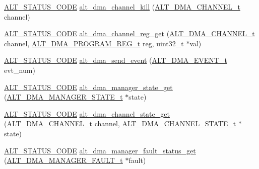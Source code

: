 \begin{DoxyCompactItemize}
\item 
\mbox{\hyperlink{hwlib_8h_abdb0d369f069723ca55d6c94bcaaaa12}{A\+L\+T\+\_\+\+S\+T\+A\+T\+U\+S\+\_\+\+C\+O\+DE}} \mbox{\hyperlink{group__ALT__DMA__CSR_gae013242eb7708db8292c6388def7802a}{alt\+\_\+dma\+\_\+channel\+\_\+kill}} (\mbox{\hyperlink{group__ALT__DMA__COMMON_ga959232e3b00ce45a3049183cce4c9d59}{A\+L\+T\+\_\+\+D\+M\+A\+\_\+\+C\+H\+A\+N\+N\+E\+L\+\_\+t}} channel)
\item 
\mbox{\hyperlink{hwlib_8h_abdb0d369f069723ca55d6c94bcaaaa12}{A\+L\+T\+\_\+\+S\+T\+A\+T\+U\+S\+\_\+\+C\+O\+DE}} \mbox{\hyperlink{group__ALT__DMA__CSR_ga25d4eb2ae938f83381401260348c3cb5}{alt\+\_\+dma\+\_\+channel\+\_\+reg\+\_\+get}} (\mbox{\hyperlink{group__ALT__DMA__COMMON_ga959232e3b00ce45a3049183cce4c9d59}{A\+L\+T\+\_\+\+D\+M\+A\+\_\+\+C\+H\+A\+N\+N\+E\+L\+\_\+t}} channel, \mbox{\hyperlink{group__ALT__DMA__PRG_ga772371a3d6334e110911154cf94950e8}{A\+L\+T\+\_\+\+D\+M\+A\+\_\+\+P\+R\+O\+G\+R\+A\+M\+\_\+\+R\+E\+G\+\_\+t}} reg, uint32\+\_\+t $\ast$val)
\item 
\mbox{\hyperlink{hwlib_8h_abdb0d369f069723ca55d6c94bcaaaa12}{A\+L\+T\+\_\+\+S\+T\+A\+T\+U\+S\+\_\+\+C\+O\+DE}} \mbox{\hyperlink{group__ALT__DMA__CSR_ga218c0ebb854b175e5b3a549003ebdeb2}{alt\+\_\+dma\+\_\+send\+\_\+event}} (\mbox{\hyperlink{group__ALT__DMA__COMMON_gad02f1735ad41b201414e8d032e0f9426}{A\+L\+T\+\_\+\+D\+M\+A\+\_\+\+E\+V\+E\+N\+T\+\_\+t}} evt\+\_\+num)
\item 
\mbox{\hyperlink{hwlib_8h_abdb0d369f069723ca55d6c94bcaaaa12}{A\+L\+T\+\_\+\+S\+T\+A\+T\+U\+S\+\_\+\+C\+O\+DE}} \mbox{\hyperlink{group__ALT__DMA__CSR_ga8cfb03775804cd8a38746bad720e3df0}{alt\+\_\+dma\+\_\+manager\+\_\+state\+\_\+get}} (\mbox{\hyperlink{group__ALT__DMA__CSR_ga7037ee411489693c9d62b992b99339b7}{A\+L\+T\+\_\+\+D\+M\+A\+\_\+\+M\+A\+N\+A\+G\+E\+R\+\_\+\+S\+T\+A\+T\+E\+\_\+t}} $\ast$state)
\item 
\mbox{\hyperlink{hwlib_8h_abdb0d369f069723ca55d6c94bcaaaa12}{A\+L\+T\+\_\+\+S\+T\+A\+T\+U\+S\+\_\+\+C\+O\+DE}} \mbox{\hyperlink{group__ALT__DMA__CSR_gafb12a5a452bf2d18013cf1bd8716f9fc}{alt\+\_\+dma\+\_\+channel\+\_\+state\+\_\+get}} (\mbox{\hyperlink{group__ALT__DMA__COMMON_ga959232e3b00ce45a3049183cce4c9d59}{A\+L\+T\+\_\+\+D\+M\+A\+\_\+\+C\+H\+A\+N\+N\+E\+L\+\_\+t}} channel, \mbox{\hyperlink{group__ALT__DMA__CSR_gaf21ed0aa09d2ac7cdbdf56da958e0b1a}{A\+L\+T\+\_\+\+D\+M\+A\+\_\+\+C\+H\+A\+N\+N\+E\+L\+\_\+\+S\+T\+A\+T\+E\+\_\+t}} $\ast$state)
\item 
\mbox{\hyperlink{hwlib_8h_abdb0d369f069723ca55d6c94bcaaaa12}{A\+L\+T\+\_\+\+S\+T\+A\+T\+U\+S\+\_\+\+C\+O\+DE}} \mbox{\hyperlink{group__ALT__DMA__CSR_ga8059684a72706044adab09ad822db447}{alt\+\_\+dma\+\_\+manager\+\_\+fault\+\_\+status\+\_\+get}} (\mbox{\hyperlink{group__ALT__DMA__CSR_gaca87b43fe85277c9791fe8f3c4d574a3}{A\+L\+T\+\_\+\+D\+M\+A\+\_\+\+M\+A\+N\+A\+G\+E\+R\+\_\+\+F\+A\+U\+L\+T\+\_\+t}} $\ast$fault)

\end{DoxyCompactItemize}
